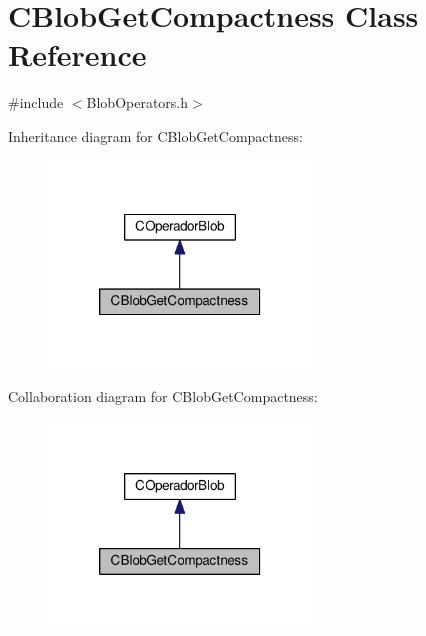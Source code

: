 \hypertarget{classCBlobGetCompactness}{\section{C\-Blob\-Get\-Compactness Class Reference}
\label{classCBlobGetCompactness}
}


{\ttfamily \#include $<$Blob\-Operators.\-h$>$}



Inheritance diagram for C\-Blob\-Get\-Compactness\-:\nopagebreak
\begin{figure}[H]
\begin{center}
\leavevmode
\includegraphics[width=198pt]{classCBlobGetCompactness__inherit__graph}
\end{center}
\end{figure}


Collaboration diagram for C\-Blob\-Get\-Compactness\-:\nopagebreak
\begin{figure}[H]
\begin{center}
\leavevmode
\includegraphics[width=198pt]{classCBlobGetCompactness__coll__graph}
\end{center}
\end{figure}
